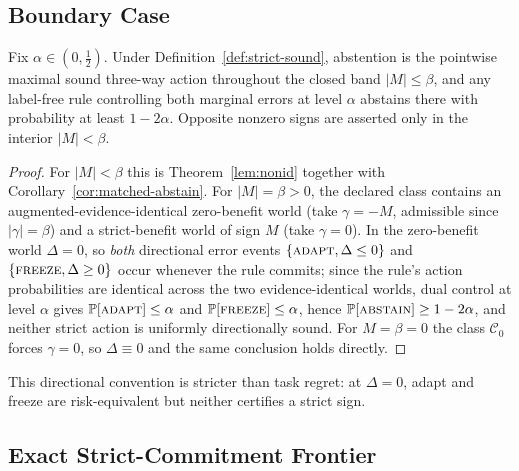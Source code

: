 \subsection{Boundary Case}

\begin{proposition}\label{prop:closed-band}
Fix $\alpha\in(0,\tfrac12)$. Under Definition~\ref{def:strict-sound}, abstention is the pointwise
maximal sound three-way action throughout the closed band $|M|\le\beta$, and any label-free rule
controlling both marginal errors at level $\alpha$ abstains there with probability at least
$1-2\alpha$. Opposite nonzero signs are asserted only in the interior $|M|<\beta$.
\end{proposition}
\begin{proof}
For $|M|<\beta$ this is Theorem~\ref{lem:nonid} together with
Corollary~\ref{cor:matched-abstain}. For $|M|=\beta>0$, the declared class contains an
augmented-evidence-identical zero-benefit world (take $\gamma=-M$, admissible since
$|\gamma|=\beta$) and a strict-benefit world of sign $M$ (take $\gamma=0$). In the zero-benefit world
$\Delta=0$, so \emph{both} directional error events $\{\textnormal{\textsc{adapt}},\Delta\le0\}$ and
$\{\textnormal{\textsc{freeze}},\Delta\ge0\}$ occur whenever the rule commits; since the rule's action
probabilities are identical across the two evidence-identical worlds, dual control at level $\alpha$
gives $\mathbb{P}[\textnormal{\textsc{adapt}}]\le\alpha$ and $\mathbb{P}[\textnormal{\textsc{freeze}}]\le\alpha$, hence
$\mathbb{P}[\textnormal{\textsc{abstain}}]\ge1-2\alpha$, and neither strict action is uniformly directionally sound.
For $M=\beta=0$ the class $\mathcal C_0$ forces $\gamma=0$, so $\Delta\equiv0$ and the same
conclusion holds directly.
\end{proof}
\noindent This directional convention is stricter
than task regret: at $\Delta=0$, adapt and freeze are risk-equivalent but neither certifies a strict
sign.

\subsection{Exact Strict-Commitment Frontier}

